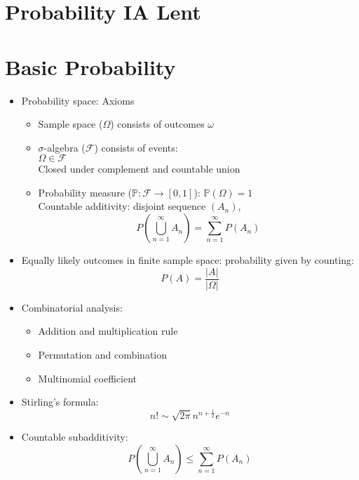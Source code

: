 


\section*{Probability \hfill IA Lent}
\section{Basic Probability}
\begin{itemize}
      \item Probability space: Axioms
            \begin{itemize}
                  \item Sample space ($\Omega$) consists of outcomes $\omega$
                  \item $\sigma$-algebra ($\mathcal{F}$) consists of events: \\
                        $\Omega \in \mathcal{F}$ \\
                        Closed under complement and countable union
                  \item Probability measure ($\mathbb{P}: \mathcal{F} \to [0,1]$): $\mathbb{P}(\Omega) = 1$ \\
                        Countable additivity: disjoint sequence $(A_n)$,
                        \[P(\bigcup_{n=1}^{\infty} A_n) = \sum_{n=1}^{\infty} P(A_n)\]
            \end{itemize}

      \item Equally likely outcomes in finite sample space: probability given by counting: \[P(A) = \frac{|A|}{|\Omega|} \]

      \item Combinatorial analysis:
            \begin{itemize}
                  \item Addition and multiplication rule
                  \item Permutation and combination
                  \item Multinomial coefficient
            \end{itemize}

      \item Stirling's formula: \[ n! \sim \sqrt{2\pi}n^{n+\frac{1}{2}}e^{-n} \]

      \item Countable subadditivity: \[P(\bigcup_{n=1}^{\infty} A_n) \leq \sum_{n=1}^{\infty} P(A_n)\]


\end{itemize}
